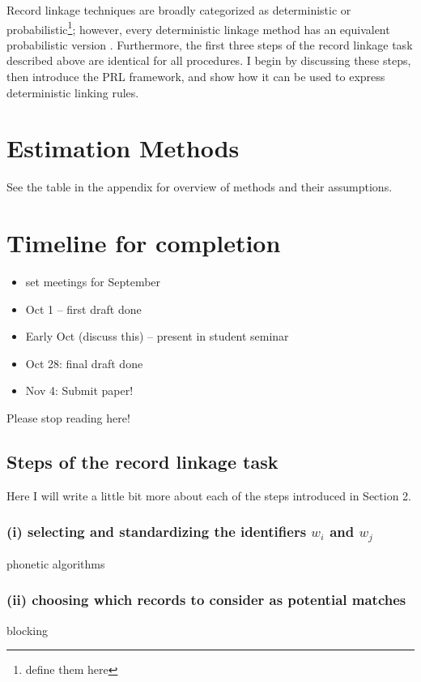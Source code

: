\documentclass[12pt]{article}
\begin{document}
Record linkage techniques are broadly categorized as deterministic or probabilistic\footnote{define them here}; however, every deterministic linkage method has an equivalent probabilistic version \citep{harron2018}.  Furthermore, the first three steps of the record linkage task described above are identical for all procedures.  I begin by discussing these steps, then introduce the PRL framework, and show how it can be used to express deterministic linking rules. 

\section{Estimation Methods}

See the table in the appendix for overview of methods and their assumptions. 

\section{Timeline for completion}

\begin{itemize}
\item set meetings for September
\item Oct 1 -- first draft done
\item Early Oct (discuss this) -- present in student seminar
\item Oct 28: final draft done
\item Nov 4: Submit paper! 
\end{itemize}





\newpage
Please stop reading here! 
\subsection{Steps of the record linkage task}

Here I will write a little bit more about each of the steps introduced in Section 2. 

\subsubsection*{(i) selecting and standardizing the identifiers $w_i$ and $w_j$}
phonetic algorithms

\subsubsection*{(ii) choosing which records to consider as potential matches}
blocking 
\end{document}
